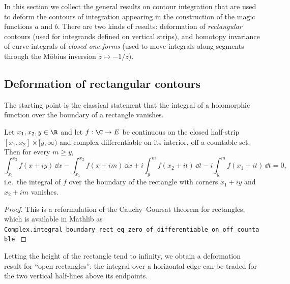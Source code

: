 In this section we collect the general results on contour integration that are used to deform the
contours of integration appearing in the construction of the magic functions $a$ and $b$. There are
two kinds of results: deformation of \emph{rectangular} contours (used for integrands defined on
vertical strips), and homotopy invariance of curve integrals of \emph{closed one-forms} (used to
move integrals along segments through the M\"obius inversion $z \mapsto -1/z$).

\subsection{Deformation of rectangular contours}

The starting point is the classical statement that the integral of a holomorphic function over the
boundary of a rectangle vanishes.

\begin{lemma}\label{lemma:rect-boundary-zero}\leanok
  Let $x_1, x_2, y \in \R$ and let $f : \C \to E$ be continuous on the closed half-strip
  $[x_1, x_2] \times [y, \infty)$ and complex differentiable on its interior, off a countable set.
  Then for every $m \geq y$,
  \[
    \int_{x_1}^{x_2} f(x + iy) \,\dd x - \int_{x_1}^{x_2} f(x + im) \,\dd x
      + i\int_{y}^{m} f(x_2 + it) \,\dd t - i\int_{y}^{m} f(x_1 + it) \,\dd t = 0,
  \]
  i.e.\ the integral of $f$ over the boundary of the rectangle with corners $x_1 + iy$ and
  $x_2 + im$ vanishes.
\end{lemma}
\begin{proof}\leanok
  This is a reformulation of the Cauchy--Goursat theorem for rectangles, which is available in
  Mathlib as \texttt{Complex.integral\_boundary\_rect\_eq\_zero\_of\_differentiable\_on\_off\_countable}.
\end{proof}

Letting the height of the rectangle tend to infinity, we obtain a deformation result for
``open rectangles'': the integral over a horizontal edge can be traded for the two vertical
half-lines above its endpoints.

